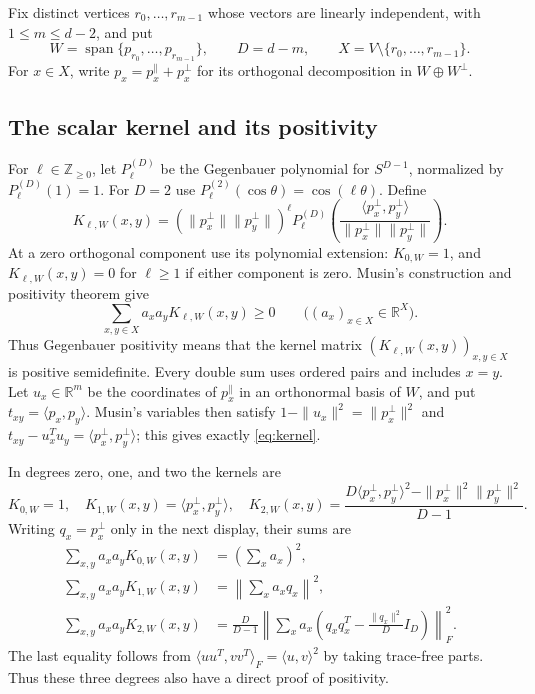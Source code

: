 \documentclass[11pt]{article}
\theoremstyle{remark}
\newcommand{\R}{\mathbb R}
\newcommand{\Z}{\mathbb Z}
\numberwithin{equation}{section}
\begin{document}
Fix distinct vertices $r_0,\ldots,r_{m-1}$ whose vectors are linearly
independent, with $1\le m\le d-2$, and put
\[
 W=\operatorname{span}\{p_{r_0},\ldots,p_{r_{m-1}}\},\qquad
 D=d-m,\qquad X=V\setminus\{r_0,\ldots,r_{m-1}\}.
\]
For $x\in X$, write $p_x=p_x^\parallel+p_x^\perp$ for its orthogonal
decomposition in $W\oplus W^\perp$.

\subsection{The scalar kernel and its positivity}\label{subsec:kernel}
For $\ell\in\Z_{\ge0}$, let $P_\ell^{(D)}$ be the Gegenbauer polynomial
for $S^{D-1}$, normalized by $P_\ell^{(D)}(1)=1$. For $D=2$ use
$P_\ell^{(2)}(\cos\theta)=\cos(\ell\theta)$. Define
\begin{equation}\label{eq:kernel}
 K_{\ell,W}(x,y)=
 (\|p_x^\perp\|\|p_y^\perp\|)^\ell
 P_\ell^{(D)}\!\left(
 \frac{\langle p_x^\perp,p_y^\perp\rangle}
 {\|p_x^\perp\|\|p_y^\perp\|}\right).
\end{equation}
At a zero orthogonal component use its polynomial extension:
$K_{0,W}=1$, and $K_{\ell,W}(x,y)=0$ for $\ell\ge1$ if either
component is zero. Musin's construction and positivity theorem
\cite[Definition~2.1 and Theorem~3.1]{musin}
give
\begin{equation}\label{eq:positivity}
 \sum_{x,y\in X}a_xa_yK_{\ell,W}(x,y)\ge0
 \qquad\bigl((a_x)_{x\in X}\in\R^X\bigr).
\end{equation}
Thus Gegenbauer positivity means that the kernel matrix
$(K_{\ell,W}(x,y))_{x,y\in X}$ is positive semidefinite.
Every double sum uses ordered pairs and includes $x=y$.
Let $u_x\in\R^m$ be the coordinates of $p_x^\parallel$ in an
orthonormal basis of $W$, and put $t_{xy}=\langle p_x,p_y\rangle$.
Musin's variables then satisfy
$1-\|u_x\|^2=\|p_x^\perp\|^2$ and
$t_{xy}-u_x^Tu_y=\langle p_x^\perp,p_y^\perp\rangle$;
this gives exactly \eqref{eq:kernel}.

In degrees zero, one, and two the kernels are
\begin{equation}\label{eq:lowkernels}
 K_{0,W}=1,\quad K_{1,W}(x,y)=\langle p_x^\perp,p_y^\perp\rangle,
 \quad K_{2,W}(x,y)=
 \frac{D\langle p_x^\perp,p_y^\perp\rangle^2
 -\|p_x^\perp\|^2\|p_y^\perp\|^2}{D-1}.
\end{equation}
Writing $q_x=p_x^\perp$ only in the next display, their sums are
\begin{align}
 \sum_{x,y}a_xa_yK_{0,W}(x,y)&=\left(\sum_xa_x\right)^2,\nonumber\\
 \sum_{x,y}a_xa_yK_{1,W}(x,y)&=\left\|\sum_xa_xq_x\right\|^2,\label{eq:squares}\\
 \sum_{x,y}a_xa_yK_{2,W}(x,y)&=
 \frac{D}{D-1}\left\|\sum_xa_x
 \left(q_xq_x^T-\frac{\|q_x\|^2}{D}I_D\right)\right\|_F^2.\nonumber
\end{align}
The last equality follows from
$\langle uu^T,vv^T\rangle_F=\langle u,v\rangle^2$ by taking trace-free
parts. Thus these three degrees also have a direct proof of positivity.
\end{document}
